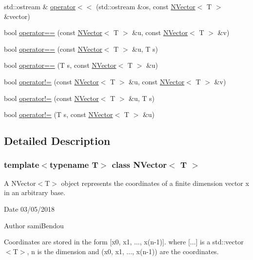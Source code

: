 \begin{DoxyCompactItemize}
std\+::ostream \& \mbox{\hyperlink{class_n_vector_a050d56598b76afac2f22094360f46238}{operator$<$$<$}} (std\+::ostream \&os, const \mbox{\hyperlink{class_n_vector}{N\+Vector}}$<$ T $>$ \&vector)
\item 
bool \mbox{\hyperlink{class_n_vector_aa1c22d1bc3a021b406c61d09f95d5e26}{operator==}} (const \mbox{\hyperlink{class_n_vector}{N\+Vector}}$<$ T $>$ \&u, const \mbox{\hyperlink{class_n_vector}{N\+Vector}}$<$ T $>$ \&v)
\item 
bool \mbox{\hyperlink{class_n_vector_aaffc8825c70b5e498690e0882d202a65}{operator==}} (const \mbox{\hyperlink{class_n_vector}{N\+Vector}}$<$ T $>$ \&u, T s)
\item 
bool \mbox{\hyperlink{class_n_vector_a4f2b795f34a0a21dfcc146ba02899a1b}{operator==}} (T s, const \mbox{\hyperlink{class_n_vector}{N\+Vector}}$<$ T $>$ \&u)
\item 
bool \mbox{\hyperlink{class_n_vector_adf3470a73ee508e6b7292bdaed2d13ba}{operator!=}} (const \mbox{\hyperlink{class_n_vector}{N\+Vector}}$<$ T $>$ \&u, const \mbox{\hyperlink{class_n_vector}{N\+Vector}}$<$ T $>$ \&v)
\item 
bool \mbox{\hyperlink{class_n_vector_a5f6935537ff657c5c48c14090322e851}{operator!=}} (const \mbox{\hyperlink{class_n_vector}{N\+Vector}}$<$ T $>$ \&u, T s)
\item 
bool \mbox{\hyperlink{class_n_vector_ad51fab9cb11a2faf828455d676ee6755}{operator!=}} (T s, const \mbox{\hyperlink{class_n_vector}{N\+Vector}}$<$ T $>$ \&u)
\end{DoxyCompactItemize}


\subsection{Detailed Description}
\subsubsection*{template$<$typename T$>$\newline
class N\+Vector$<$ T $>$}

A N\+Vector$<$\+T$>$ object represents the coordinates of a finite dimension vector x in an arbitrary base. 

\begin{DoxyDate}{Date}
03/05/2018 
\end{DoxyDate}
\begin{DoxyAuthor}{Author}
sami\+Bendou
\end{DoxyAuthor}
Coordinates are stored in the form \mbox{[}x0, x1, ..., x(n-\/1)\mbox{]}. where \mbox{[}...\mbox{]} is a std\+::vector$<$\+T$>$, n is the dimension and (x0, x1, ..., x(n-\/1)) are the coordinates.

